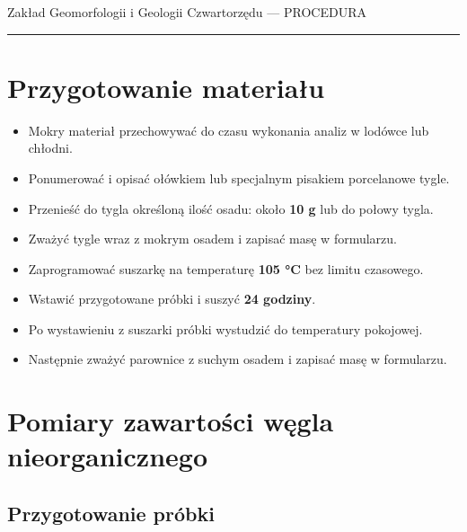 \documentclass[
  letterpaper,
  DIV=11,
  numbers=noendperiod]{scrreprt}
\begin{document}
Zakład Geomorfologii i Geologii Czwartorzędu --- PROCEDURA

\begin{center}\rule{0.5\linewidth}{0.5pt}\end{center}

\hypertarget{przygotowanie-materiaux142u}{%
\section{Przygotowanie materiału}\label{przygotowanie-materiaux142u}}

\begin{itemize}
\item
  Mokry materiał przechowywać do czasu wykonania analiz w lodówce lub
  chłodni.
\item
  Ponumerować i opisać ołówkiem lub specjalnym pisakiem porcelanowe
  tygle.
\item
  Przenieść do tygla określoną ilość osadu: około \textbf{10 g} lub do
  połowy tygla.
\item
  Zważyć tygle wraz z mokrym osadem i zapisać masę w formularzu.
\item
  Zaprogramować suszarkę na temperaturę \textbf{105 °C} bez limitu
  czasowego.
\item
  Wstawić przygotowane próbki i suszyć \textbf{24 godziny}.
\item
  Po wystawieniu z suszarki próbki wystudzić do temperatury pokojowej.
\item
  Następnie zważyć parownice z suchym osadem i zapisać masę w
  formularzu.
\end{itemize}

\hypertarget{pomiary-zawartoux15bci-wux119gla-nieorganicznego}{%
\section{Pomiary zawartości węgla
nieorganicznego}\label{pomiary-zawartoux15bci-wux119gla-nieorganicznego}}

\hypertarget{przygotowanie-pruxf3bki}{%
\subsection{Przygotowanie próbki}\label{przygotowanie-pruxf3bki}}
\end{document}
